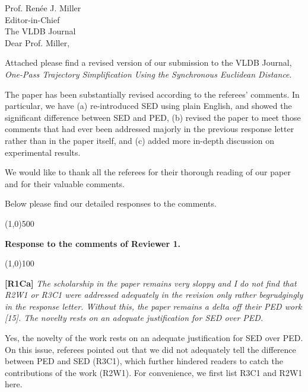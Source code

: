 \documentclass{letter}
\begin{document}
Prof. {Ren{\'{e}}e J. Miller} \\
Editor-in-Chief		\\
The VLDB Journal	\\



Dear Prof. Miller,

Attached please find a revised version of our submission to
the VLDB Journal, \emph{One-Pass Trajectory Simplification Using the Synchronous Euclidean Distance}.


{The paper has been substantially revised according to the referees' comments. In particular, we have (a) re-introduced SED using plain English, and showed the significant difference between SED and PED, (b) revised the paper to meet those comments that had ever been addressed majorly in the previous response letter rather than in the paper itself, and (c) added more in-depth discussion on experimental results.}

We would like to thank all the referees for their thorough reading of our paper and for their valuable comments.

Below please find our detailed responses to the comments.



\line(1,0){500}

\textbf{Response to the comments of Reviewer 1.}

\line(1,0){100}


\textbf{[R1Ca]} \emph{The scholarship in the paper remains very sloppy and I do not find that {R2W1} or {R3C1} were addressed adequately in the revision only rather begrudgingly in the response letter. Without this, the paper remains a delta off their PED work [15]. The novelty rests on an adequate justification for SED over PED.}

Yes, the novelty of the work rests on an adequate justification for SED over PED. On this issue, referees pointed out that we did not adequately tell the difference between PED and SED (R3C1), which further hindered readers to catch the contributions of the work (R2W1). For convenience, we first list R3C1 and R2W1 here.
\end{document}

